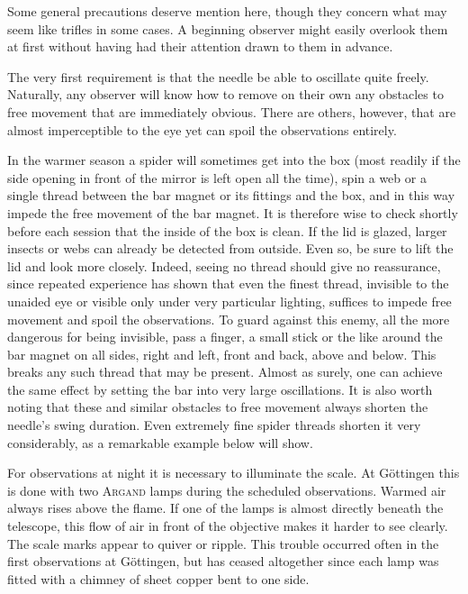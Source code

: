 Some general precautions deserve mention here, though they concern what may seem like trifles in some cases. A beginning observer might easily overlook them at first without having had their attention drawn to them in advance.

The very first requirement is that the needle be able to oscillate quite freely. Naturally, any observer will know how to remove on their own any obstacles to free movement that are immediately obvious. There are others, however, that are almost imperceptible to the eye yet can spoil the observations entirely.

In the warmer season a spider will sometimes get into the box (most readily if the side opening in front of the mirror is left open all the time), spin a web or a single thread between the bar magnet or its fittings and the box, and in this way impede the free movement of the
bar magnet. It is therefore wise to check shortly before each session that the inside of the box is clean. If the lid is glazed, larger insects or webs can already be detected from outside. Even so, be sure to lift the lid and look more closely. Indeed, seeing no thread should give no reassurance, since repeated experience has shown that even the finest thread, invisible to the unaided eye or visible only under very particular lighting, suffices to impede free movement and spoil the observations. To guard against this enemy, all the more dangerous for being invisible, pass a finger, a small stick or the like around the bar magnet on all sides, right and left, front and back, above and below. This breaks any such thread that may be present. Almost as surely, one can achieve the same effect by setting the bar into very large oscillations. It is also worth noting that these and similar obstacles to free movement always shorten the needle’s swing duration. Even extremely fine spider threads shorten it very considerably, as a remarkable example below will show.

For observations at night it is necessary to illuminate the scale. At Göttingen this is done with two \textsc{Argand} lamps during the scheduled observations. Warmed air always rises above the flame. If one of the lamps is almost directly beneath the telescope, this flow of air in front of the objective makes it harder to see clearly. The scale marks appear to quiver or ripple. This trouble occurred often in the first observations at Göttingen, but has ceased altogether since each lamp was fitted with a chimney of sheet copper bent to one side.

